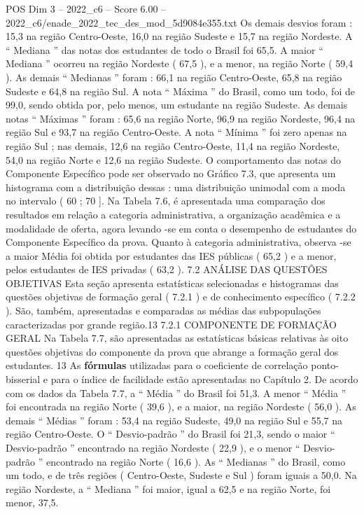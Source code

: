 \begin{textsample}{POS Dim 3 – 2022\_c6 – Score 6.00 – 2022\_c6/enade\_2022\_tec\_des\_mod\_5d9084e355.txt}
Os demais desvios foram : 15,3 na região Centro-Oeste, 16,0 na região Sudeste e 15,7 na região Nordeste.
A “ Mediana ” das notas dos estudantes de todo o Brasil foi 65,5.
A maior “ Mediana ” ocorreu na região Nordeste ( 67,5 ), e a menor, na região Norte ( 59,4 ).
As demais “ Medianas ” foram : 66,1 na região Centro-Oeste, 65,8 na região Sudeste e 64,8 na região Sul.
A nota “ Máxima ” do Brasil, como um todo, foi de 99,0, sendo obtida por, pelo menos, um estudante na região Sudeste.
As demais notas “ Máximas ” foram : 65,6 na região Norte, 96,9 na região Nordeste, 96,4 na região Sul e 93,7 na região Centro-Oeste.
A nota “ Mínima ” foi zero apenas na região Sul ; nas demais, 12,6 na região Centro-Oeste, 11,4 na região Nordeste, 54,0 na região Norte e 12,6 na região Sudeste.
O comportamento das notas do Componente Específico pode ser observado no Gráfico 7.3, que apresenta um histograma com a distribuição dessas : uma distribuição unimodal com a moda no intervalo ( 60 ; 70 ].
Na Tabela 7.6, é apresentada uma comparação dos resultados em relação a categoria administrativa, a organização acadêmica e a modalidade de oferta, agora levando -se em conta o desempenho de estudantes do Componente Específico da prova.
Quanto à categoria administrativa, observa -se a maior Média foi obtida por estudantes das IES públicas ( 65,2 ) e a menor, pelos estudantes de IES privadas ( 63,2 ). 7.2 ANÁLISE DAS QUESTÕES OBJETIVAS Esta seção apresenta estatísticas selecionadas e histogramas das questões objetivas de formação geral ( 7.2.1 ) e de conhecimento específico ( 7.2.2 ).
São, também, apresentadas e comparadas as médias das subpopulações caracterizadas por grande região.13 7.2.1 COMPONENTE DE FORMAÇÃO GERAL Na Tabela 7.7, são apresentadas as estatísticas básicas relativas às oito questões objetivas do componente da prova que abrange a formação geral dos estudantes. 13 As \textbf{fórmulas} utilizadas para o coeficiente de correlação ponto-bisserial e para o índice de facilidade estão apresentadas no Capítulo 2.
De acordo com os dados da Tabela 7.7, a “ Média ” do Brasil foi 51,3.
A menor “ Média ” foi encontrada na região Norte ( 39,6 ), e a maior, na região Nordeste ( 56,0 ).
As demais “ Médias ” foram : 53,4 na região Sudeste, 49,0 na região Sul e 55,7 na região Centro-Oeste.
O “ Desvio-padrão ” do Brasil foi 21,3, sendo o maior “ Desvio-padrão ” encontrado na região Nordeste ( 22,9 ), e o menor “ Desvio-padrão ” encontrado na região Norte ( 16,6 ).
As “ Medianas ” do Brasil, como um todo, e de três regiões ( Centro-Oeste, Sudeste e Sul ) foram iguais a 50,0.
Na região Nordeste, a “ Mediana ” foi maior, igual a 62,5 e na região Norte, foi menor, 37,5.

\end{textsample}
